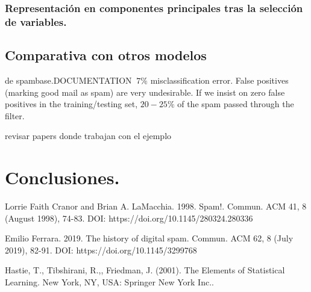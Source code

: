 \documentclass[12pt, letterpaper]{article}
\begin{document}
\subsubsection{Representación en componentes principales tras la selección de variables.}

\subsection{Comparativa con otros modelos}

de spambase.DOCUMENTATION
$~7\%$ misclassification error.
False positives (marking good mail as spam) are very undesirable.
If we insist on zero false positives in the training/testing set,
$20-25\%$ of the spam passed through the filter.

revisar papers donde trabajan con el ejemplo

\section{Conclusiones.}

\begin{thebibliography}{1}

Lorrie Faith Cranor and Brian A. LaMacchia. 1998. Spam!. Commun. ACM 41, 8 (August 1998), 74-83. DOI: https://doi.org/10.1145/280324.280336

Emilio Ferrara. 2019. The history of digital spam. Commun. ACM 62, 8 (July 2019), 82-91. DOI: https://doi.org/10.1145/3299768

Hastie, T., Tibshirani, R.,, Friedman, J. (2001). The Elements of Statistical Learning. New York, NY, USA: Springer New York Inc.. 

\end{thebibliography}
\end{document}
